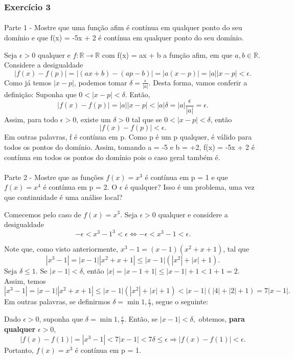 \documentclass[Calculus1/exercícios_de_cálculo.tex]{subfiles}
\begin{document}
\subsubsection{Exercício 3}
\paragraph{} Parte 1 - Mostre que uma função afim é contínua em qualquer ponto do seu dom\'inio e que f(x) = -5x + 2 é cont\'inua em qualquer ponto do seu dom\'inio.
\begin{proof*}
	Seja $\epsilon > 0$ qualquer e $f:\mathbb{R}\rightarrow\mathbb{R}$ com f(x) = ax + b a função afim, em que $a, b\in\mathbb{R}$. Considere a desigualdade
	$$
		|f(x) - f(p)| = |(ax + b) - (ap - b)| = |a(x - p)| = |a||x - p|< \epsilon.
	$$
	Como já temos $|x - p|$, podemos tomar $\delta = \frac{\epsilon}{|a|}.$ Desta forma, vamos conferir a definição: Suponha que $0 < |x - p| < \delta.$ Então,
	$$
		|f(x) - f(p)| = |a||x - p| < |a|\delta = |a|\frac{\epsilon}{|a|} = \epsilon.
	$$
	Assim, para todo $\epsilon > 0$, existe um $\delta > 0$ tal que se $0 < |x - p| < \delta$, então
	$$
		|f(x) - f(p)| < \epsilon.
	$$
	Em outras palavras, f é contínua em p. Como p é um p qualquer, é válido para todos os pontos do dom\'inio. Assim, tomando a = -5 e b = +2, f(x) = -5x + 2 é cont\'inua em todos os pontos do dom\'inio pois o caso geral também é.

	\qedsymbol
\end{proof*}

\paragraph{} Parte 2 - Mostre que as funções $f(x) = x^3$ é contínua em p = 1 e que $f(x) = x^4$ é cont\'inua em p = 2. O $\epsilon$ é qualquer? Isso é um problema, uma vez que continuidade é uma análise local?
\begin{sol*}
	Comecemos pelo caso de $f(x) = x^3$. Seja $\epsilon > 0$ qualquer e considere a desigualdade
	$$
		-\epsilon < x^3 - 1^3 < \epsilon \Leftrightarrow -\epsilon < x^3 - 1 < \epsilon.
	$$

	Note que, como visto anteriormente, $x^3 - 1 = (x - 1)(x^2 + x + 1)$, tal que
	$$
		|x^3 - 1| = |x - 1||x^2 + x + 1| \leq |x - 1|(|x^2| + |x| + 1).
	$$
	Seja $\delta \leq 1$. Se $|x - 1| < \delta$, então $|x| = |x - 1 + 1| \leq |x - 1| + 1 < 1 + 1 = 2.$ Assim, temos
	$$
		|x^3 - 1| = |x - 1||x^2 + x + 1| \leq |x - 1|(|x^2| + |x| + 1) < |x-1|(|4| + |2| + 1) = 7|x - 1|.
	$$
	Em outras palavras, se definirmos $\delta = \min{1,\frac{\epsilon}{7}}$, segue o seguinte:

	Dado $\epsilon > 0$, suponha que $\delta = \min{1, \frac{\epsilon}{7}}$. Então, se $|x - 1| < \delta,$ obtemos, \textbf{para qualquer} $\epsilon > 0$,
	$$
		|f(x) - f(1)| = |x^3 - 1| < 7|x - 1| < 7\delta \leq \epsilon \Rightarrow |f(x) - f(1)| < \epsilon.
	$$
	Portanto, $f(x) = x^3$ é contínua em p = 1.

\end{sol*}
\end{document}
